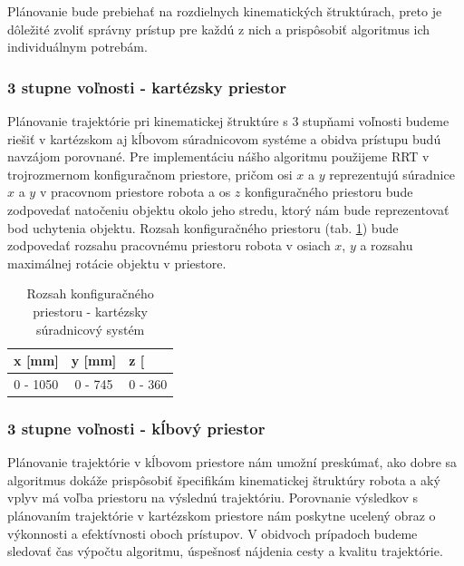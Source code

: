 Plánovanie bude prebiehať na rozdielnych kinematických štruktúrach, preto je dôležité zvoliť správny prístup pre každú z nich a prispôsobiť algoritmus ich individuálnym potrebám.

 
\subsubsection{3 stupne voľnosti - kartézsky priestor}

Plánovanie trajektórie pri kinematickej štruktúre s 3 stupňami voľnosti budeme riešiť v kartézskom aj kĺbovom súradnicovom systéme a obidva prístupu budú navzájom porovnané. Pre implementáciu nášho algoritmu použijeme RRT v trojrozmernom konfiguračnom priestore, pričom osi $x$ a $y$ reprezentujú súradnice $x$ a $y$ v pracovnom priestore robota a os $z$ konfiguračného priestoru bude zodpovedať natočeniu objektu okolo jeho stredu, ktorý nám bude reprezentovať bod uchytenia objektu. Rozsah konfiguračného priestoru (tab. \ref{table 3.1}) bude zodpovedať rozsahu pracovnému priestoru robota v osiach $x$, $y$ a rozsahu maximálnej rotácie objektu v priestore.

\begin{table}[h!]
	\centering
	\begin{tabular}{|c|c|c|}
		\hline
		\multicolumn{1}{|l|}{x {[}mm{]}}  & \multicolumn{1}{l|}{y {[}mm{]}} & \multicolumn{1}{l|}{z {[}\degree{]}} \\ \hline
		0 - 1050                                              & 0 - 745                                             & 0 - 360                              \\ \hline

	\end{tabular}
	\caption{Rozsah konfiguračného priestoru - kartézsky súradnicový systém}\label{table 3.1} 
\end{table}

\subsubsection{3 stupne voľnosti - kĺbový priestor}

Plánovanie trajektórie v kĺbovom priestore nám umožní preskúmať, ako dobre sa algoritmus dokáže prispôsobiť špecifikám kinematickej štruktúry robota a aký vplyv má voľba priestoru na výslednú trajektóriu. Porovnanie výsledkov s plánovaním trajektórie v kartézskom priestore nám poskytne ucelený obraz o výkonnosti a efektívnosti oboch prístupov.  V obidvoch prípadoch budeme sledovať čas výpočtu algoritmu, úspešnosť nájdenia cesty a kvalitu trajektórie.

